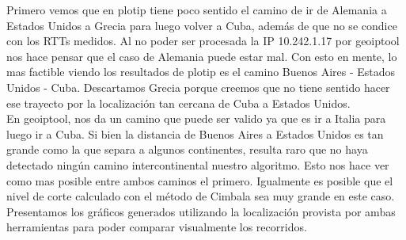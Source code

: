 Primero vemos que en plotip tiene poco sentido el camino de ir de Alemania a
Estados Unidos a Grecia para luego volver a Cuba, adem\'as de que no se condice
con los RTTs medidos. Al no poder ser procesada la IP 10.242.1.17 por geoiptool
nos hace pensar que el caso de Alemania puede estar mal. Con esto en mente, lo
mas factible viendo los resultados de plotip es el camino Buenos Aires -
Estados Unidos - Cuba. Descartamos Grecia porque creemos que no tiene sentido
hacer ese trayecto por la localizaci\'on tan cercana de Cuba a Estados
Unidos.\\

En geoiptool, nos da un camino que puede ser valido ya que es ir a Italia para
luego ir a Cuba. Si bien la distancia de Buenos Aires a Estados Unidos es tan
grande como la que separa a algunos continentes, resulta raro que no haya
detectado ningún camino intercontinental nuestro algoritmo. Esto nos hace ver
como mas posible entre ambos caminos el primero. Igualmente es posible que el
nivel de corte calculado con el método de Cimbala sea muy grande en este
caso.\\

Presentamos los gráficos generados utilizando la localizaci\'on provista por
ambas herramientas para poder comparar visualmente los recorridos.


